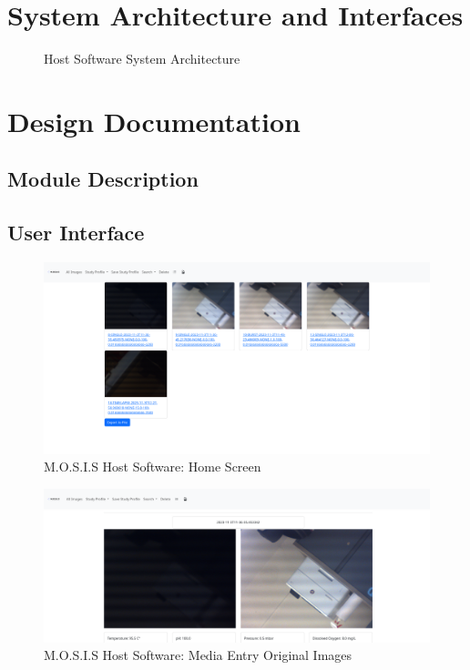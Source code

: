 \documentclass[12pt]{article}
\begin{document}
\section{System Architecture and Interfaces}
\begin{figure}[H]
	\caption{Host Software System Architecture}
\end{figure}
\section{Design Documentation}
\subsection{Module Description}
\subsection{User Interface}
\begin{figure}[H]
	\includegraphics[width=\textwidth]{Figures/index_view.png}
	\caption{M.O.S.I.S Host Software: Home Screen}
\end{figure}
\begin{figure}[H]
	\includegraphics[width=\textwidth]{Figures/left_right_images_media_enty.png}
	\caption{M.O.S.I.S Host Software: Media Entry Original Images}
\end{figure}
\end{document}
